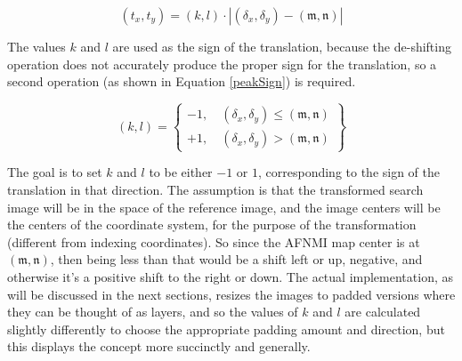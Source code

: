 \begin{equation}
\label{peakTranslation}
	(t_{x},t_{y})=(k,l) \cdot \left| (\delta_{x},\delta_{y}) - (\mathfrak{m},\mathfrak{n}) \right|
\end{equation}

\noindent The values $k$ and $l$ are used as the sign of the translation, because the de-shifting operation does not accurately produce the proper sign for the translation, so a second operation (as shown in Equation \ref{peakSign}) is required.

\begin{equation}
\label{peakSign}
	(k,l) = \begin{Bmatrix}
	-1, \quad (\delta_{x},\delta_{y}) \le (\mathfrak{m},\mathfrak{n}) 
	\\ +1, \quad (\delta_{x},\delta_{y}) > (\mathfrak{m},\mathfrak{n})
	\end{Bmatrix}
\end{equation}

\noindent The goal is to set $k$ and $l$ to be either $-1$ or $1$, corresponding to the sign of the translation in that direction. The assumption is that the transformed search image will be in the space of the reference image, and the image centers will be the centers of the coordinate system, for the purpose of the transformation (different from indexing coordinates). So since the AFNMI map center is at $(\mathfrak{m},\mathfrak{n})$, then being less than that would be a shift left or up, negative, and otherwise it's a positive shift to the right or down. The actual implementation, as will be discussed in the next sections, resizes the images to padded versions where they can be thought of as layers, and so the values of $k$ and $l$ are calculated slightly differently to choose the appropriate padding amount and direction, but this displays the concept more succinctly and generally.




